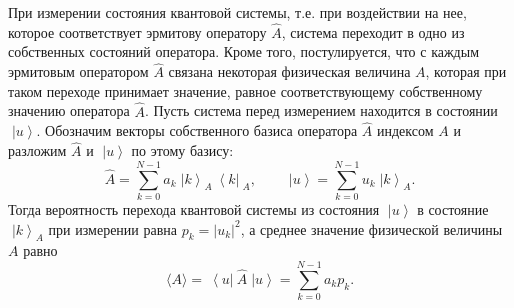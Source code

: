 \documentclass[a4paper]{report}
\newcommand{\ket}[1] {\!\!\;\ensuremath{\left|#1\right\rangle}}
\newcommand{\bra}[1] {\!\!\:\ensuremath{\left\langle#1\right|\!\!\:}}
\begin{document}
При измерении состояния квантовой системы, т.е. при воздействии на нее, которое соответствует эрмитову оператору $\hat{A}$, система переходит в одно из собственных состояний оператора. Кроме того, постулируется, что с каждым эрмитовым оператором $\hat{A}$ связана некоторая физическая величина ${A}$, которая при таком переходе принимает значение, равное соответствующему собственному значению  оператора $\hat{A}$. Пусть система перед измерением находится в состоянии $\ket{u}$. Обозначим векторы собственного базиса оператора $\hat{A}$ индексом $\scriptstyle{A}$ и разложим $\hat{A}$ и $\ket{u}$ по этому базису:
\begin{equation*}
\hat{A}= \sum\limits_{k=0}^{N-1}a_{k} \ket{k}_{\!\scriptscriptstyle\!A}\!\bra{k}_{\scriptscriptstyle\!A}, \qquad
\ket{u}= \sum\limits_{k=0}^{N-1} u_{k}\ket{k}_{\!\scriptscriptstyle\!A}.
\end{equation*}
Тогда вероятность перехода квантовой системы из состояния $\ket{u}$ в состояние $\ket{k}_{\scriptscriptstyle\!A}$ при измерении равна $p_k= |u_{k}|^2$, а среднее значение физической величины ${A}$ равно
\begin{equation*}
  \langle{A}\rangle= \bra{u}\hat{A}\ket{u}= \sum\limits_{k=0}^{N-1}a_{k}p_k.
\end{equation*}
\end{document}
